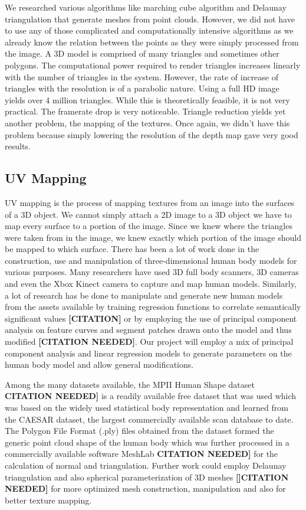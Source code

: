 \documentclass{article}
\begin{document}
We researched various algorithms like marching cube algorithm and Delaunay triangulation that generate meshes from point clouds. However, we did not have to use any of those complicated and computationally intensive algorithms as we already know the relation between the points as they were simply processed from the image.
A 3D model is comprised of many triangles and sometimes other polygons. The computational power required to render triangles increases linearly with the number of triangles in the system. However, the rate of increase of triangles with the resolution is of a parabolic nature. Using a full HD image yields over 4 million triangles. While this is theoretically feasible, it is not very practical. The framerate drop is very noticeable. Triangle reduction yields yet another problem, the mapping of the textures. Once again, we didn’t have this problem because simply lowering the resolution of the depth map gave very good results.
    
    \subsection {UV Mapping}
UV mapping is the process of mapping textures from an image into the surfaces of a 3D object. We cannot simply attach a 2D image to a 3D object we have to map every surface to a portion of the image. Since we knew where the triangles were taken from in the image, we knew exactly which portion of the image should be mapped to which surface.
There has been a lot of work done in the construction, use and manipulation of three-dimensional human body models for various purposes. Many researchers have used 3D full body scanners, 3D cameras and even the Xbox Kinect camera to capture and map human models. Similarly, a lot of research has be done to manipulate and generate new human models from the assets available by training regression functions to correlate semantically significant values \textbf{[CITATION]} or by employing the use of principal component analysis on feature curves and segment patches drawn onto the model and thus modified \textbf{[CITATION NEEDED]}. Our project will employ a mix of principal component analysis and linear regression models to generate parameters on the human body model and allow general modifications.

Among the many datasets available, the MPII Human Shape dataset \textbf{ CITATION NEEDED]} is a readily available free dataset that was used which was based on the widely used statistical body representation and learned from the CAESAR dataset, the largest commercially available scan database to date. The Polygon File Format (.ply) files obtained from the dataset formed the generic point cloud shape of the human body which was further processed in a commercially available software MeshLab \textbf{ CITATION NEEDED]} for the calculation of normal and triangulation. Further work could employ Delaunay triangulation and also spherical parameterization of 3D meshes \textbf{[]CITATION NEEDED]} for more optimized mesh construction, manipulation and also for better texture mapping.
\end{document}
